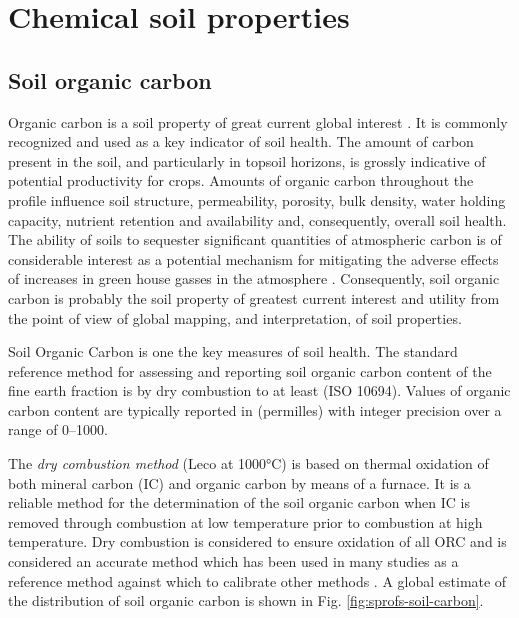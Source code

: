 \documentclass[11pt]{krantz}
\makeatletter
\newenvironment{kframe}{%
\medskip{}
\setlength{\fboxsep}{.8em}
 \def\at@end@of@kframe{}%
 \ifinner\ifhmode%
  \def\at@end@of@kframe{\end{minipage}}%
  \begin{minipage}{\columnwidth}%
 \fi\fi%
 \def\FrameCommand##1{\hskip\@totalleftmargin \hskip-\fboxsep
 \colorbox{shadecolor}{##1}\hskip-\fboxsep
     \hskip-\linewidth \hskip-\@totalleftmargin \hskip\columnwidth}%
 \MakeFramed {\advance\hsize-\width
   \@totalleftmargin\z@ \linewidth\hsize
   \@setminipage}}%
 {\par\unskip\endMakeFramed%
 \at@end@of@kframe}
\newenvironment{rmdblock}[1]
  {
  \begin{itemize}
  \renewcommand{\labelitemi}{
    \raisebox{-.7\height}[0pt][0pt]{
      {\setkeys{Gin}{width=3em,keepaspectratio}\texttt{[image: images/\#1]}}
    }
  }
  \setlength{\fboxsep}{1em}
  \begin{kframe}
  \item
  }
  {
  \end{kframe}
  \end{itemize}
  }
\newenvironment{rmdnote}
  {\begin{rmdblock}{note}}
  {\end{rmdblock}}
\theoremstyle{definition}
\theoremstyle{definition}
\theoremstyle{definition}
\theoremstyle{remark}
\makeatother
\begin{document}
\hypertarget{chemical-soil-properties}{%
\section{Chemical soil properties}\label{chemical-soil-properties}}

\hypertarget{soil-organic-carbon}{%
\subsection{Soil organic carbon}\label{soil-organic-carbon}}

Organic carbon is a soil property of great current global interest
\citep{Smith2004SUM, Smith2010CUP, Panagos2013439}. It is commonly
recognized and used as a key indicator of soil health. The amount of
carbon present in the soil, and particularly in topsoil horizons, is
grossly indicative of potential productivity for crops. Amounts of
organic carbon throughout the profile influence soil structure,
permeability, porosity, bulk density, water holding capacity, nutrient
retention and availability and, consequently, overall soil health. The
ability of soils to sequester significant quantities of atmospheric
carbon is of considerable interest as a potential mechanism for
mitigating the adverse effects of increases in green house gasses in the
atmosphere \citep{Smith2004SUM, Conant2010, Scharlemann2014CM}.
Consequently, soil organic carbon is probably the soil property of
greatest current interest and utility from the point of view of global
mapping, and interpretation, of soil properties.

\begin{rmdnote}
Soil Organic Carbon is one the key measures of soil health. The standard
reference method for assessing and reporting soil organic carbon content
of the fine earth fraction is by dry combustion to at least (ISO 10694).
Values of organic carbon content are typically reported in (permilles)
with integer precision over a range of 0--1000.
\end{rmdnote}

The \emph{dry combustion method} (Leco at 1000°C) is based on thermal
oxidation of both mineral carbon (IC) and organic carbon by means of a
furnace. It is a reliable method for the determination of the soil
organic carbon when IC is removed through combustion at low temperature
prior to combustion at high temperature. Dry combustion is considered to
ensure oxidation of all ORC and is considered an accurate method which
has been used in many studies as a reference method against which to
calibrate other methods
\citep{Grewal1991JSS, Meersmans2009SUM, Bisutti2004TAC}. A global
estimate of the distribution of soil organic carbon is shown in Fig.
\ref{fig:sprofs-soil-carbon}.
\end{document}
